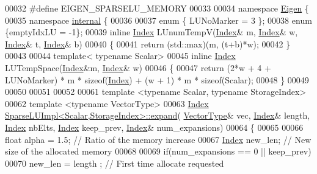 \begin{DoxyCode}
00032 \textcolor{preprocessor}{#define EIGEN\_SPARSELU\_MEMORY}
00033 
00034 \textcolor{keyword}{namespace }\hyperlink{namespace_eigen}{Eigen} \{
00035 \textcolor{keyword}{namespace }\hyperlink{namespaceinternal}{internal} \{
00036   
00037 \textcolor{keyword}{enum} \{ LUNoMarker = 3 \};
00038 \textcolor{keyword}{enum} \{emptyIdxLU = -1\};
00039 \textcolor{keyword}{inline} \hyperlink{namespace_eigen_a62e77e0933482dafde8fe197d9a2cfde}{Index} LUnumTempV(\hyperlink{namespace_eigen_a62e77e0933482dafde8fe197d9a2cfde}{Index}& m, \hyperlink{namespace_eigen_a62e77e0933482dafde8fe197d9a2cfde}{Index}& w, \hyperlink{namespace_eigen_a62e77e0933482dafde8fe197d9a2cfde}{Index}& t, \hyperlink{namespace_eigen_a62e77e0933482dafde8fe197d9a2cfde}{Index}& b)
00040 \{
00041   \textcolor{keywordflow}{return} (std::max)(m, (t+b)*w);
00042 \}
00043 
00044 \textcolor{keyword}{template}< \textcolor{keyword}{typename} Scalar>
00045 \textcolor{keyword}{inline} \hyperlink{namespace_eigen_a62e77e0933482dafde8fe197d9a2cfde}{Index} LUTempSpace(\hyperlink{namespace_eigen_a62e77e0933482dafde8fe197d9a2cfde}{Index}&m, \hyperlink{namespace_eigen_a62e77e0933482dafde8fe197d9a2cfde}{Index}& w)
00046 \{
00047   \textcolor{keywordflow}{return} (2*w + 4 + LUNoMarker) * m * \textcolor{keyword}{sizeof}(\hyperlink{namespace_eigen_a62e77e0933482dafde8fe197d9a2cfde}{Index}) + (w + 1) * m * \textcolor{keyword}{sizeof}(Scalar);
00048 \}
00049 
00050 
00051 
00052 
00061 \textcolor{keyword}{template} <\textcolor{keyword}{typename} Scalar, \textcolor{keyword}{typename} StorageIndex>
00062 \textcolor{keyword}{template} <\textcolor{keyword}{typename} VectorType>
00063 \hyperlink{namespace_eigen_a62e77e0933482dafde8fe197d9a2cfde}{Index}  \hyperlink{group___sparse_l_u___module_acc7811f7de19ffb804cb4b1fd5288f3e}{SparseLUImpl<Scalar,StorageIndex>::expand}(
      \hyperlink{struct_vector_type}{VectorType}& vec, \hyperlink{namespace_eigen_a62e77e0933482dafde8fe197d9a2cfde}{Index}& length, \hyperlink{namespace_eigen_a62e77e0933482dafde8fe197d9a2cfde}{Index} nbElts, \hyperlink{namespace_eigen_a62e77e0933482dafde8fe197d9a2cfde}{Index} keep\_prev, 
      \hyperlink{namespace_eigen_a62e77e0933482dafde8fe197d9a2cfde}{Index}& num\_expansions) 
00064 \{
00065   
00066   \textcolor{keywordtype}{float} alpha = 1.5; \textcolor{comment}{// Ratio of the memory increase }
00067   \hyperlink{namespace_eigen_a62e77e0933482dafde8fe197d9a2cfde}{Index} new\_len; \textcolor{comment}{// New size of the allocated memory}
00068   
00069   \textcolor{keywordflow}{if}(num\_expansions == 0 || keep\_prev) 
00070     new\_len = length ; \textcolor{comment}{// First time allocate requested}

\end{DoxyCode}
